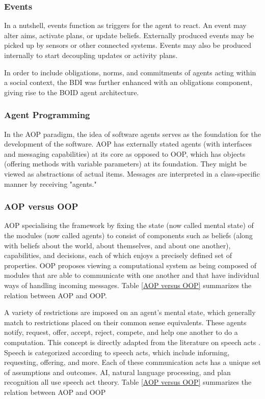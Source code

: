     \vspace{.5cm}
    
    \subsubsection{Events}
    In a nutshell, events function as triggers for the agent to react. An event may alter aims, activate plans, or update beliefs. Externally produced events may be picked up by sensors or other connected systems. Events may also be produced internally to start decoupling updates or activity plans.

In order to include obligations, norms, and commitments of agents acting within a social context, the \ac{BDI} was further enhanced with an obligations component, giving rise to the \ac{BOID} \cite{boid} agent architecture.


\subsubsection{Agent Programming}

In the \ac{AOP} paradigm, the idea of software agents serves as the foundation for the development of the software. \ac{AOP} has externally stated agents (with interfaces and messaging capabilities) at its core as opposed to \ac{OOP}, which has objects (offering methods with variable parameters) at its foundation. They might be viewed as abstractions of actual items. Messages are interpreted in a class-specific manner by receiving "agents."

\subsubsection{AOP versus OOP}

\ac{AOP} specialising the framework by fixing the state (now called mental state) of the modules (now called agents) to consist of components such as beliefs (along with beliefs about the world, about themselves, and about one another), capabilities, and decisions, each of which enjoys a precisely defined set of properties. OOP proposes viewing a computational system as being composed of modules that are able to communicate with one another and that have individual ways of handling incoming messages.  Table \ref{AOP versus OOP} summarizes the relation between \ac{AOP} and \ac{OOP}.

\vspace{.5cm}

A variety of restrictions are imposed on an agent's mental state, which generally match to restrictions placed on their common sense equivalents. These agents notify, request, offer, accept, reject, compete, and help one another to do a computation. This concept is directly adapted from the literature on speech acts \cite{speech}. Speech is categorized according to speech acts, which include informing, requesting, offering, and more. Each of these communication acts has a unique set of assumptions and outcomes. \ac{AI}, natural language processing, and plan recognition all use speech act theory.
 Table \ref{AOP versus OOP} summarizes the relation between AOP and OOP

